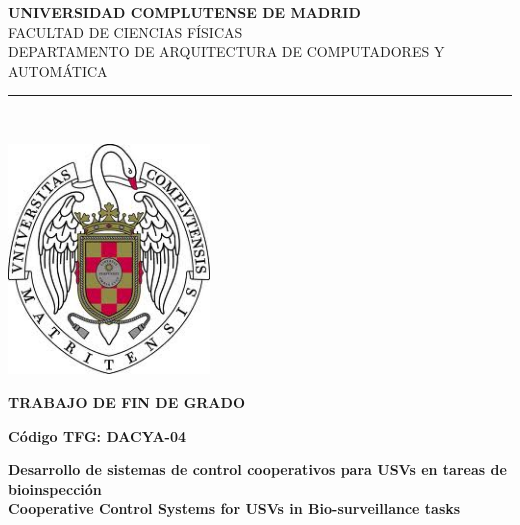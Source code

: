 \begin{center}

   \vspace{1cm}


   {\Large \textbf{UNIVERSIDAD COMPLUTENSE DE MADRID}}\\

   \vspace{0.3cm}
   {\Large FACULTAD DE CIENCIAS FÍSICAS}\\
   \vspace{0.3cm}
   {DEPARTAMENTO DE ARQUITECTURA DE COMPUTADORES Y AUTOMÁTICA}\\

   

   \vspace{0.65cm}
   \rule{2in}{0.5pt}\\
   \vspace{0.85cm}

\vspace{0.5cm}

  \includegraphics[height=2.4in]{figures/escudo.jpg}

   \vspace{0.5cm}  
  {\large \textbf{TRABAJO DE FIN DE GRADO}}\\ 

  \vspace{0.3cm} 

  \textbf{Código TFG: DACYA-04}\\
  
   \vspace{0.5cm}
     
  \textbf{Desarrollo de sistemas de control cooperativos para USVs en tareas de bioinspección}\\
  \vspace{0.3cm}  
  \textbf{Cooperative Control Systems for USVs in Bio-surveillance tasks}


\end{center}
